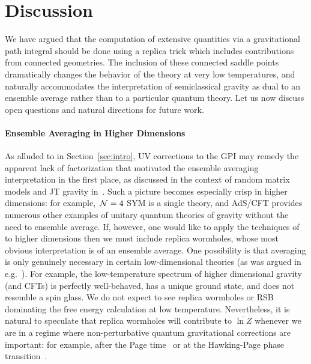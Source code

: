 \documentclass[12pt]{article}
\begin{document}
\section{Discussion}
\label{sec:disc}

We have argued that the computation of extensive quantities via a gravitational path integral should be done using a replica trick which includes contributions from connected geometries.  The inclusion of these connected saddle points dramatically changes the behavior of the theory at very low temperatures, and naturally accommodates the interpretation of  semiclassical gravity as dual to an ensemble average rather than to a particular quantum theory.  Let us now discuss open questions and natural directions for future work.

\paragraph{Ensemble Averaging in Higher Dimensions} As alluded to in Section~\ref{sec:intro}, UV corrections to the GPI may remedy the apparent lack of factorization that motivated the ensemble averaging interpretation in the first place, as discussed in the context of random matrix models and JT gravity in~\cite{SSS}.  Such a picture becomes especially crisp in higher dimensions: for example,~${\cal N}=4$ SYM is a single theory, and AdS/CFT provides numerous other examples of unitary quantum theories of gravity without the need to ensemble average.  If, however, one would like to apply the techniques of~\cite{PenShe19, AlmHar19} to higher dimensions then we must include replica wormholes, whose most obvious interpretation is of an ensemble average.  One possibility is that averaging is only genuinely necessary in certain low-dimensional theories (as was argued in e.g.~\cite{McNamara:2020uza}).  For example, the low-temperature spectrum of higher dimensional gravity (and CFTs) is perfectly well-behaved, has a unique ground state, and does not resemble a spin glass.  We do not expect to see replica wormholes or RSB dominating the free energy calculation at low temperature.  Nevertheless, it is natural to speculate that replica wormholes will contribute to $\overline{\ln Z}$ whenever we are in a regime where non-perturbative quantum gravitational corrections are important: for example, after the Page time~\cite{Pag93} or at the Hawking-Page phase transition~\cite{HawPag83}.
\end{document}
